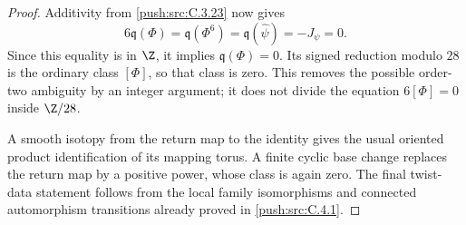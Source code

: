 \begin{proof}
Additivity from \ref{push:src:C.3.23} now gives
\[
 6\mathfrak q(\Phi)=\mathfrak q(\Phi^6)
                   =\mathfrak q(\widehat\psi)=-J_\psi=0.
\]
Since this equality is in $\Z$, it implies
$\mathfrak q(\Phi)=0$. Its signed reduction modulo $28$
is the ordinary class $[\Phi]$, so that class is zero.
This removes the possible order-two ambiguity by an integer
argument; it does not divide the equation $6[\Phi]=0$ inside
$\Z/28$.

A smooth isotopy from the return map to the identity gives
the usual oriented product identification of its mapping
torus. A finite cyclic base change replaces the return map
by a positive power, whose class is again zero. The final
twist-data statement follows from the local family isomorphisms
and connected automorphism transitions already proved in \ref{push:src:C.4.1}.
\end{proof}
